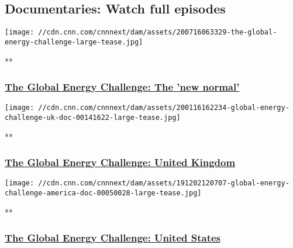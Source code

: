 \hypertarget{documentaries-watch-full-episodes}{%
\subsection{Documentaries: Watch full
episodes}\label{documentaries-watch-full-episodes}}

\href{/videos/business/2020/07/16/the-global-energy-challenge.cnnbusiness}{}

\texttt{[image: //cdn.cnn.com/cnnnext/dam/assets/200716063329-the-global-energy-challenge-large-tease.jpg]}

**

\hypertarget{the-global-energy-challenge-the-new-normal-1}{%
\subsubsection{\texorpdfstring{\href{/videos/business/2020/07/16/the-global-energy-challenge.cnnbusiness}{The
Global Energy Challenge: The 'new
normal'}}{The Global Energy Challenge: The 'new normal'}}\label{the-global-energy-challenge-the-new-normal-1}}

\href{/videos/business/2020/01/16/global-energy-challenge-uk-doc.cnn}{}

\texttt{[image: //cdn.cnn.com/cnnnext/dam/assets/200116162234-global-energy-challenge-uk-doc-00141622-large-tease.jpg]}

**

\hypertarget{the-global-energy-challenge-united-kingdom}{%
\subsubsection{\texorpdfstring{\href{/videos/business/2020/01/16/global-energy-challenge-uk-doc.cnn}{The
Global Energy Challenge: United
Kingdom}}{The Global Energy Challenge: United Kingdom}}\label{the-global-energy-challenge-united-kingdom}}

\href{/videos/business/2019/12/02/global-energy-challenge-america-doc.cnn}{}

\texttt{[image: //cdn.cnn.com/cnnnext/dam/assets/191202120707-global-energy-challenge-america-doc-00050028-large-tease.jpg]}

**

\hypertarget{the-global-energy-challenge-united-states}{%
\subsubsection{\texorpdfstring{\href{/videos/business/2019/12/02/global-energy-challenge-america-doc.cnn}{The
Global Energy Challenge: United
States}}{The Global Energy Challenge: United States}}\label{the-global-energy-challenge-united-states}}


